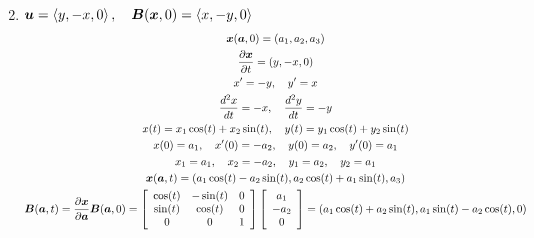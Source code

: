 \documentclass{article}
\begin{document}
\begin{enumerate}
\begin{gather*}
    \end{gather*}
    \item $\boldsymbol{u} = \left< y, -x, 0\right>, \quad \boldsymbol{B}(\boldsymbol{x},0) = \left< x,
    -y, 0\right>$
    \begin{gather*}
        \boldsymbol{x}(\boldsymbol{a}, 0) = \left(a_1, a_2, a_3\right)\\
        \frac{\partial \boldsymbol{x}}{\partial t} = \left(y, -x, 0\right)\\
        x' = -y, \quad y' = x\\
        \frac{d^2x}{dt} = -x, \quad \frac{d^2y}{dt} = -y\\
        x(t) = x_1\cos(t) + x_2\sin(t), \quad y(t) = y_1\cos(t) + y_2\sin(t)\\
        x(0) = a_1, \quad x'(0) = -a_2, \quad y(0) = a_2, \quad y'(0) = a_1\\
        x_1 = a_1, \quad x_2 = -a_2, \quad y_1 = a_2, \quad y_2 = a_1\\
        \boldsymbol{x}(\boldsymbol{a},t) = \left(a_1\cos(t) - a_2\sin(t), a_2\cos(t) + a_1\sin(t),
        a_3\right)\\
        \boldsymbol{B}(\boldsymbol{a},t) = \frac{\partial \boldsymbol{x}}{\partial \boldsymbol{a}}\boldsymbol{B}(\boldsymbol{a},0)
        = \left[\begin{array}{c c c}
        \cos(t) & -\sin(t) & 0\\
        \sin(t) & \cos(t) & 0\\
        0 & 0 & 1\end{array}\right] \left[\begin{array}{c}
        a_1\\-a_2\\0\end{array}\right] = \left(a_1\cos(t) + a_2\sin(t),
        a_1\sin(t) - a_2\cos(t), 0\right)
    \end{gather*}
\end{enumerate}
\end{document}
